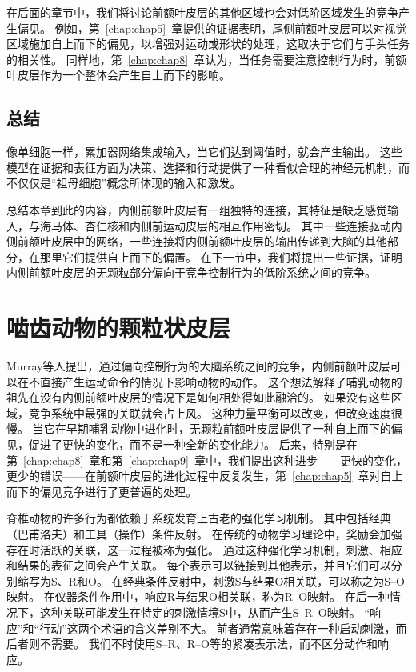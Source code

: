 在后面的章节中，我们将讨论前额叶皮层的其他区域也会对低阶区域发生的竞争产生偏见。
例如，第~\ref{chap:chap5}~章提供的证据表明，尾侧前额叶皮层可以对视觉区域施加自上而下的偏见，以增强对运动或形状的处理，这取决于它们与手头任务的相关性。
同样地，第~\ref{chap:chap8}~章认为，当任务需要注意控制行为时，前额叶皮层作为一个整体会产生自上而下的影响。\par



\subsection{总结}

像单细胞一样，累加器网络集成输入，当它们达到阈值时，就会产生输出。
这些模型在证据和表征方面为决策、选择和行动提供了一种看似合理的神经元机制，而不仅仅是“祖母细胞”概念所体现的输入和激发。\par


总结本章到此的内容，内侧前额叶皮层有一组独特的连接，其特征是缺乏感觉输入，与海马体、杏仁核和内侧前运动皮层的相互作用密切。
其中一些连接驱动内侧前额叶皮层中的网络，一些连接将内侧前额叶皮层的输出传递到大脑的其他部分，在那里它们提供自上而下的偏置。
在下一节中，我们将提出一些证据，证明内侧前额叶皮层的无颗粒部分偏向于竞争控制行为的低阶系统之间的竞争。\par



\section{啮齿动物的颗粒状皮层}

Murray等人\cite{murray2011can}提出，通过偏向控制行为的大脑系统之间的竞争，内侧前额叶皮层可以在不直接产生运动命令的情况下影响动物的动作。
这个想法解释了哺乳动物的祖先在没有内侧前额叶皮层的情况下是如何相处得如此融洽的。
如果没有这些区域，竞争系统中最强的关联就会占上风。 这种力量平衡可以改变，但改变速度很慢。
当它在早期哺乳动物中进化时，无颗粒前额叶皮层提供了一种自上而下的偏见，促进了更快的变化，而不是一种全新的变化能力。
后来，特别是在第~\ref{chap:chap8}~章和第~\ref{chap:chap9}~章中，我们提出这种进步——更快的变化，更少的错误——在前额叶皮层的进化过程中反复发生，第~\ref{chap:chap5}~章对自上而下的偏见竞争进行了更普遍的处理。\par


脊椎动物的许多行为都依赖于系统发育上古老的强化学习机制。
其中包括经典（巴甫洛夫）和工具（操作）条件反射\cite{dickinson1980contemporary}。
在传统的动物学习理论中，奖励会加强存在时活跃的关联，这一过程被称为强化。
通过这种强化学习机制，刺激、相应和结果的表征之间会产生关联。
每个表示可以链接到其他表示，并且它们可以分别缩写为S、R和O。
在经典条件反射中，刺激S与结果O相关联，可以称之为S–O映射。
在仪器条件作用中，响应R与结果O相关联，称为R–O映射。
在后一种情况下，这种关联可能发生在特定的刺激情境S中，从而产生S–R–O映射。
“响应”和“行动”这两个术语的含义差别不大。
前者通常意味着存在一种启动刺激，而后者则不需要。
我们不时使用S–R、R–O等的紧凑表示法，而不区分动作和响应。\par


